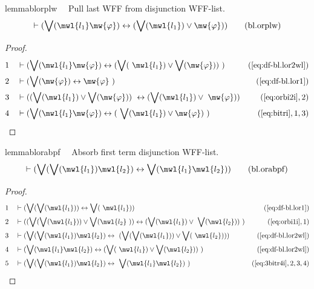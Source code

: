 \begin{restatable}{lemma}{blorplw}~~ Pull last WFF from disjunction WFF-list.
\begin{align}
\vdash ( \bigvee( \mwl{l_1} \mw{\varphi} ) \leftrightarrow ( \bigvee( \mwl{l_1}
    ) \vee \mw{\varphi} ) )\label{eq:bl.orplw}\tag{bl.orplw}
\end{align}
\end{restatable}

\begin{proof}
\begin{align}
  1 &&  & \vdash ( \bigvee( \mwl{l_1} \mw{\varphi} ) \leftrightarrow ( \bigvee(
     ~\mwl{l_1} ) \vee \bigvee( \mw{\varphi} ) )
     ~)&(\mbox{\ref{eq:df-bl.lor2wl}})\notag
  \\ 2 &&  & \vdash ( \bigvee( \mw{\varphi} ) \leftrightarrow \mw{\varphi}
     ~)&(\mbox{\ref{eq:df-bl.lor1}})\notag
  \\ 3 &&  & \vdash ( ( \bigvee( \mwl{l_1} ) \vee \bigvee( \mw{\varphi} ) )
     ~\leftrightarrow ( \bigvee( \mwl{l_1} ) \vee
     ~\mw{\varphi} ) )&(\mbox{\ref{eq:orbi2i}},2)\notag
  \\ 4 &&  & \vdash ( \bigvee( \mwl{l_1} \mw{\varphi} ) \leftrightarrow (
     ~\bigvee( \mwl{l_1} ) \vee \mw{\varphi} )
     ~)&(\mbox{\ref{eq:bitri}},1,3)\notag
\end{align}
\end{proof}

\begin{restatable}{lemma}{blorabpf}~~ Absorb first term disjunction WFF-list.
\begin{align}
\vdash ( \bigvee( \bigvee( \mwl{l_1} ) \mwl{l_2} ) \leftrightarrow \bigvee(
    \mwl{l_1} \mwl{l_2} ) )\label{eq:bl.orabpf}\tag{bl.orabpf}
\end{align}
\end{restatable}

\begin{proof}
\begin{align}
  1 &&  & \vdash ( \bigvee( \bigvee( \mwl{l_1} ) ) \leftrightarrow \bigvee(
     ~\mwl{l_1} ) )&(\mbox{\ref{eq:df-bl.lor1}})\notag
  \\ 2 &&  & \vdash ( ( \bigvee( \bigvee( \mwl{l_1} ) ) \vee \bigvee( \mwl{l_2}
     ~) ) \leftrightarrow ( \bigvee( \mwl{l_1} ) \vee
     ~\bigvee( \mwl{l_2} ) )
     ~)&(\mbox{\ref{eq:orbi1i}},1)\notag
  \\ 3 &&  & \vdash ( \bigvee( \bigvee( \mwl{l_1} ) \mwl{l_2} ) \leftrightarrow
     ~( \bigvee( \bigvee( \mwl{l_1} ) ) \vee \bigvee(
     ~\mwl{l_2} ) ) )&(\mbox{\ref{eq:df-bl.lor2wl}})\notag
  \\ 4 &&  & \vdash ( \bigvee( \mwl{l_1} \mwl{l_2} ) \leftrightarrow ( \bigvee(
     ~\mwl{l_1} ) \vee \bigvee( \mwl{l_2} ) )
     ~)&(\mbox{\ref{eq:df-bl.lor2wl}})\notag
  \\ 5 &&  & \vdash ( \bigvee( \bigvee( \mwl{l_1} ) \mwl{l_2} ) \leftrightarrow
     ~\bigvee( \mwl{l_1} \mwl{l_2} )
     ~)&(\mbox{\ref{eq:3bitr4i}},2,3,4)\notag
\end{align}
\end{proof}

